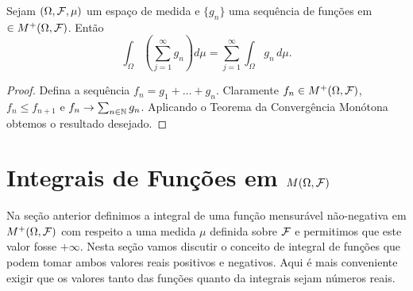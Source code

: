 \begin{corolario}
Sejam $(\Omega,\mathcal{F},\mu)$ um espaço de medida e 
$\{g_n\}$ uma sequência de funções em 
$\in M^{+}(\Omega,\mathcal{F})$. Então 
	\[
		\int_{\Omega} \left(\sum_{j=1}^{\infty} g_n\right) d\mu
		=
		\sum_{j=1}^{\infty}\int_{\Omega}  g_n\, d\mu.
	\]  
\end{corolario}


\begin{proof}
Defina a sequência $f_n=g_1+\ldots+g_n$.
Claramente $f_n\in M^{+}(\Omega,\mathcal{F})$,
$f_n\leq f_{n+1}$ e $f_n\to \sum_{n\in \mathbb{N}} g_n$. 
Aplicando o Teorema da Convergência Monótona obtemos o resultado
desejado.
\end{proof}




\section{Integrais de Funções em $M(\Omega,\mathcal{F})$  }

Na seção anterior definimos a integral de uma 
função mensurável não-negativa em $M^{+}(\Omega,\mathcal{F})$ 
com respeito a uma medida $\mu$ definida sobre $\mathcal{F}$ 
e permitimos que este valor fosse $+\infty$.
Nesta seção vamos discutir o conceito de integral
de funções que podem tomar ambos valores reais
positivos e negativos. Aqui é mais conveniente 
exigir que os valores tanto das funções quanto 
da integrais sejam números reais.







